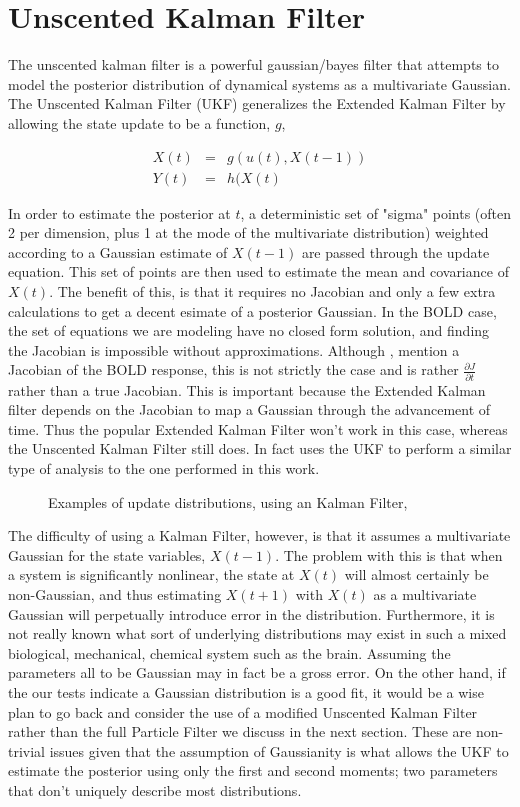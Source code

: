 \documentclass{article}
\begin{document}
\section{Unscented Kalman Filter}
The unscented kalman filter is a powerful gaussian/bayes filter that attempts
to model the posterior distribution of dynamical systems as a multivariate
Gaussian. The Unscented Kalman Filter (UKF) generalizes the Extended Kalman
Filter by allowing the state update to be a function, $g$,

\begin{eqnarray}
X(t) &=& g(u(t), X(t-1))\\
Y(t) &=& h(X(t)
\end{eqnarray}

In order to estimate the posterior at $t$, a deterministic set of "sigma" points 
(often 2 per dimension, plus 1 at the mode of the multivariate distribution)
weighted according to a Gaussian estimate of $X(t-1)$ are passed through
the update equation. This set of points are then used to estimate the 
mean and covariance of $X(t)$. The benefit of this, is that it requires
no Jacobian and only a few extra calculations to get a decent esimate of
a posterior Gaussian. In the BOLD case, the set of equations we are modeling have no 
closed form solution, and finding the Jacobian is impossible without approximations. Although 
\cite{Riera2004}, \cite{Hu2009} mention a Jacobian of the BOLD response, this is
not strictly the case and is rather $\frac{\partial J}{\partial t}$
rather than a true Jacobian.  This is important because the Extended
Kalman filter depends on the Jacobian to map a Gaussian through the 
advancement of time. Thus the popular Extended Kalman Filter won't work
in this case, whereas the Unscented Kalman Filter still does. In fact
\cite{Hu2009} uses the UKF to perform a similar type of analysis to
the one performed in this work. 

\begin{figure}
\label{fig:EKFWorking}
\caption{Examples of update distributions, using an Kalman Filter, \cite{Thrun}}
\end{figure}

The difficulty
of using a Kalman Filter, however, is that it assumes a multivariate 
Gaussian for the state variables, $X(t-1)$. The problem with this is that 
when a system is significantly nonlinear, the state at 
$X(t)$ will almost certainly be non-Gaussian, and thus estimating
$X(t+1)$ with $X(t)$ as a multivariate Gaussian will perpetually introduce
error in the distribution. Furthermore, it is not really known what 
sort of underlying distributions may exist in such a mixed biological,
mechanical, chemical system such as the brain. Assuming the parameters
all to be Gaussian may in fact be a gross error. On the other hand, if
the our tests indicate a Gaussian distribution is a good fit, it would
be a wise plan to go back and consider the use of a modified Unscented 
Kalman Filter rather
than the full Particle Filter we discuss in the next section. These are 
non-trivial issues given that the assumption of Gaussianity is what allows
the UKF to estimate the posterior using only the first and second moments;
two parameters that don't uniquely describe most distributions.
\end{document}
